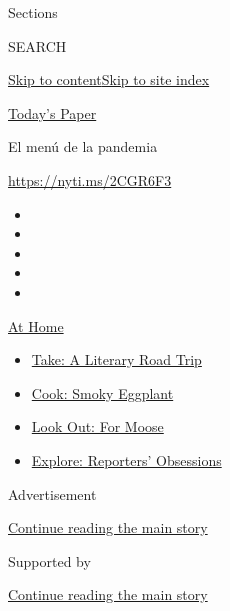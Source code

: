 Sections

SEARCH

\protect\hyperlink{site-content}{Skip to
content}\protect\hyperlink{site-index}{Skip to site index}

\href{https://myaccount.nytimes.com/auth/login?response_type=cookie\&client_id=vi}{}

\href{https://www.nytimes.com/section/todayspaper}{Today's Paper}

El menú de la pandemia

\url{https://nyti.ms/2CGR6F3}

\begin{itemize}
\item
\item
\item
\item
\item
\end{itemize}

\href{https://www.nytimes.com/spotlight/at-home?action=click\&pgtype=Article\&state=default\&region=TOP_BANNER\&context=at_home_menu}{At
Home}

\begin{itemize}
\tightlist
\item
  \href{https://www.nytimes.com/2020/07/28/books/time-for-a-literary-road-trip.html?action=click\&pgtype=Article\&state=default\&region=TOP_BANNER\&context=at_home_menu}{Take:
  A Literary Road Trip}
\item
  \href{https://www.nytimes.com/2020/07/29/magazine/bored-with-your-home-cooking-some-smoky-eggplant-will-fix-that.html?action=click\&pgtype=Article\&state=default\&region=TOP_BANNER\&context=at_home_menu}{Cook:
  Smoky Eggplant}
\item
  \href{https://www.nytimes.com/2020/07/27/travel/moose-michigan-isle-royale.html?action=click\&pgtype=Article\&state=default\&region=TOP_BANNER\&context=at_home_menu}{Look
  Out: For Moose}
\item
  \href{https://www.nytimes.com/interactive/2020/at-home/even-more-reporters-editors-diaries-lists-recommendations.html?action=click\&pgtype=Article\&state=default\&region=TOP_BANNER\&context=at_home_menu}{Explore:
  Reporters' Obsessions}
\end{itemize}

Advertisement

\protect\hyperlink{after-top}{Continue reading the main story}

Supported by

\protect\hyperlink{after-sponsor}{Continue reading the main story}

